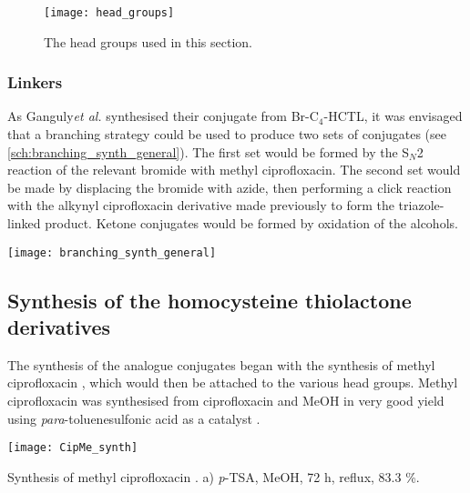 \begin{figure}[H]
	\begin{center}
		\texttt{[image: head\_groups]}
		\caption{The head groups used in this section.\label{fig:head_groups}}
	\end{center}
\end{figure}

\subsubsection{Linkers}

As Ganguly\textit{et al.}\cite{Ganguly2001} synthesised their conjugate from Br-C$_4$-HCTL, it was envisaged that a branching strategy could be used to produce two sets of conjugates (see \ref{sch:branching_synth_general}). The first set would be formed by the S$_N$2 reaction of the relevant bromide with methyl ciprofloxacin. The second set would be made by displacing the bromide with azide, then performing a click reaction with the alkynyl ciprofloxacin derivative  made previously to form the triazole-linked product. Ketone conjugates would be formed by oxidation of the alcohols.

\begin{scheme}[H]
	\begin{center}
		\texttt{[image: branching\_synth\_general]}
		\caption{\label{sch:branching_synth_general}}
	\end{center}
\end{scheme}

\subsection{Synthesis of the homocysteine thiolactone derivatives\label{sec:HCTL}}

The synthesis of the analogue conjugates began with the synthesis of methyl ciprofloxacin , which would then be attached to the various head groups.
Methyl ciprofloxacin  was synthesised from ciprofloxacin  and MeOH in very good yield using \textit{para}-toluenesulfonic acid as a catalyst \cite{Sachin2010}.

\begin{scheme}[H]
	\begin{center}
		\texttt{[image: CipMe\_synth]}
		\caption{Synthesis of methyl ciprofloxacin . a) \textit{p}-TSA, MeOH, 72 h, reflux, 83.3 \%. \label{sch:CipMe_synth}}
	\end{center}
\end{scheme}

